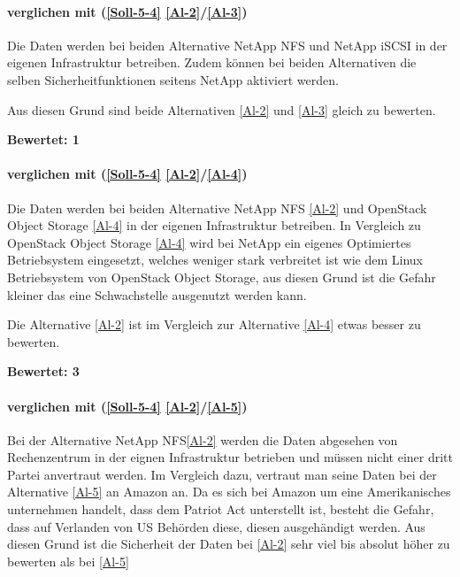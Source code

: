\paragraph*{  verglichen mit  (\ref{Soll-5-4} \ref{Al-2}/\ref{Al-3})}
Die Daten werden bei beiden Alternative NetApp NFS und NetApp iSCSI in der eigenen Infrastruktur betreiben. Zudem können bei beiden Alternativen die selben Sicherheitfunktionen seitens NetApp aktiviert werden.

Aus diesen Grund sind beide Alternativen  \ref{Al-2} und  \ref{Al-3} gleich zu bewerten.

\textbf{Bewertet: 1}

\paragraph*{  verglichen mit  (\ref{Soll-5-4} \ref{Al-2}/\ref{Al-4})}
Die Daten werden bei beiden Alternative NetApp NFS \ref{Al-2} und OpenStack Object Storage \ref{Al-4} in der eigenen Infrastruktur betreiben. In Vergleich zu OpenStack Object Storage \ref{Al-4} wird bei NetApp ein eigenes Optimiertes Betriebsystem eingesetzt, welches weniger stark verbreitet ist wie dem Linux Betriebsystem von OpenStack Object Storage, aus diesen Grund ist die Gefahr kleiner das eine Schwachstelle ausgenutzt werden kann.

Die Alternative  \ref{Al-2} ist im Vergleich zur Alternative  \ref{Al-4} etwas besser zu bewerten.

\textbf{Bewertet: 3}

\paragraph*{  verglichen mit  (\ref{Soll-5-4} \ref{Al-2}/\ref{Al-5})}
Bei der Alternative NetApp NFS\ref{Al-2} werden die Daten abgesehen von Rechenzentrum in der eignen Infrastruktur betrieben und müssen nicht einer dritt Partei anvertraut werden. Im Vergleich dazu, vertraut man seine Daten bei der Alternative \ref{Al-5} an Amazon an. Da es sich bei Amazon um eine Amerikanisches unternehmen handelt, dass dem Patriot Act unterstellt ist, besteht die Gefahr, dass auf Verlanden von US Behörden diese, diesen ausgehändigt werden. Aus diesen Grund ist die Sicherheit der Daten bei \ref{Al-2} sehr viel bis absolut höher zu bewerten als bei \ref{Al-5}

